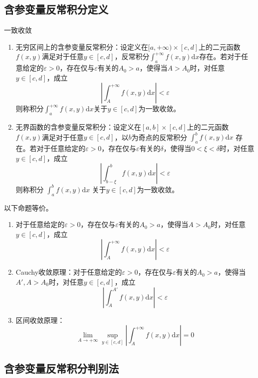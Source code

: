 \documentclass[lang = cn, scheme = chinese, thmcnt = section]{elegantbook}
\newcommand{\dis}{\displaystyle}
\begin{document}
\subsection{含参变量反常积分定义}

\begin{definition}{一致收敛} 		
	\begin{enumerate}
		\item 无穷区间上的含参变量反常积分：设定义在$[a,+\infty)\times[c,d]$上的二元函数$f(x,y)$满足对于任意$y\in[c,d]$，反常积分$\dis \int_{a}^{+\infty}{f(x,y)\mathrm{d}x}$存在。若对于任意给定的$\varepsilon>0$，存在仅与$\varepsilon$有关的$A_0>a$，使得当$A>A_0$时，对任意$y\in[c,d]$，成立
		$$
		\left|\int_{A}^{+\infty}{f(x,y)\mathrm{d}x}\right|<\varepsilon
		$$
		则称积分$\dis \int_{a}^{+\infty}{f(x,y)\mathrm{d}x}$关于$y\in[c,d]$为一致收敛。
		\item 无界函数的含参变量反常积分：设定义在$[a,b]\times[c,d]$上的二元函数$f(x,y)$满足对于任意$y\in[c,d]$，以$b$为奇点的反常积分
		$\dis\int_{a}^{b}{f(x,y)\mathrm{d}x}$
		存在。若对于任意给定的$\varepsilon>0$，存在仅与$\varepsilon$有关的$\delta$，使得当$0<\xi<\delta$时，对任意$y\in[c,d]$，成立
		$$
		\left|\int_{b-\xi}^{b}{f(x,y)\mathrm{d}x}\right|<\varepsilon
		$$
		则称积分
		$\dis\int_{a}^{b}{f(x,y)\mathrm{d}x}$
		关于$y\in[c,d]$为一致收敛。
	\end{enumerate}
\end{definition}

\begin{theorem}
	以下命题等价。
	\begin{enumerate}
		\item 对于任意给定的$\varepsilon>0$，存在仅与$\varepsilon$有关的$A_0>a$，使得当$A>A_0$时，对任意$y\in[c,d]$，成立
		$$
		\left|\int_{A}^{+\infty}{f(x,y)\mathrm{d}x}\right|<\varepsilon
		$$
		\item Cauchy收敛原理：对于任意给定的$\varepsilon>0$，存在仅与$\varepsilon$有关的$A_0>a$，使得当$A',A>A_0$时，对任意$y\in[c,d]$，成立
		$$
		\left|\int_{A}^{A'}{f(x,y)\mathrm{d}x}\right|<\varepsilon
		$$
		\item 区间收敛原理：
		$$
		\lim_{A\to+\infty}\sup_{y\in[c,d]}\left|\int_{A}^{+\infty}{f(x,y)\mathrm{d}x}\right|=0
		$$
	\end{enumerate}
\end{theorem}

\subsection{含参变量反常积分判别法}
\end{document}
